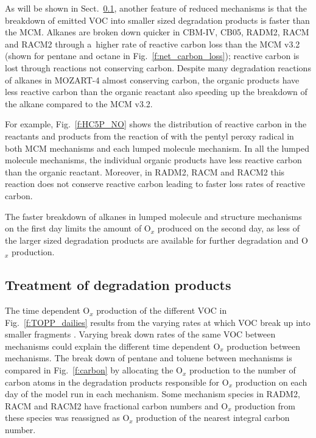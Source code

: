 \documentclass[acpd, online, hvmath]{copernicus}
\begin{document}
As will be shown in Sect.~\ref{ss:products}, another feature of
reduced mechanisms is that the breakdown of emitted VOC into smaller
sized degradation products is faster than the MCM.  Alkanes are broken
down quicker in CBM-IV, CB05, RADM2, RACM and RACM2 through a~higher
rate of reactive carbon loss than the MCM v3.2 (shown for pentane and
octane in Fig.~\ref{f:net_carbon_loss}); reactive carbon is lost
through reactions not conserving carbon.  Despite many degradation
reactions of alkanes in MOZART-4 almost conserving carbon, the organic
products have less reactive carbon than the organic reactant also
speeding up the breakdown of the alkane compared to the MCM v3.2.

For example, Fig.~\ref{f:HC5P_NO} shows the distribution of reactive
carbon in the reactants and products from the reaction of 
with the pentyl peroxy radical in both MCM mechanisms and each lumped
molecule mechanism.  In all the lumped molecule mechanisms, the
individual organic products have less reactive carbon than the organic
reactant.  Moreover, in RADM2, RACM and RACM2 this reaction does not
conserve reactive carbon leading to faster loss rates of reactive
carbon.

The faster breakdown of alkanes in lumped molecule and structure
mechanisms on the first day limits the amount of O$_{x}$ produced
on the second day, as less of the larger sized degradation products
are available for further degradation and O$_{x}$ production.


\subsection{Treatment of degradation products}
\label{ss:products}

The time dependent O$_{x}$ production of the different VOC in
Fig.~\ref{f:TOPP_dailies} results from the varying rates at which VOC
break up into smaller fragments \citep{Butler:2011}.  Varying break
down rates of the same VOC between mechanisms could explain the
different time dependent O$_{x}$ production between mechanisms.
The break down of pentane and toluene between mechanisms is compared
in Fig.~\ref{f:carbon} by allocating the O$_{x}$ production to the
number of carbon atoms in the degradation products responsible for
O$_{x}$ production on each day of the model run in each mechanism.
Some mechanism species in RADM2, RACM and RACM2 have fractional carbon
numbers \citep{Stockwell:1990, Stockwell:1997, Goliff:2013} and
O$_{x}$ production from these species was reassigned as O$_{x}$
production of the nearest integral carbon number.
\end{document}
